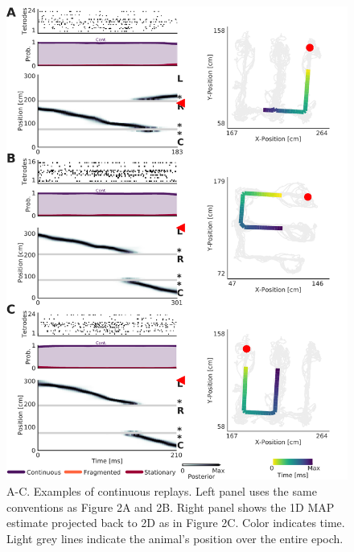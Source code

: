 \documentclass[times, twoside]{zHenriquesLab-StyleBioRxiv}
\begin{document}
\begin{figure}%
\centering
\includegraphics[width=0.80\linewidth]{figures/Figure2-supplemental2/Figure2_v3-supplemental2}
\caption{A-C. Examples of continuous replays. Left panel uses the same conventions as Figure 2A and 2B. Right panel shows the 1D MAP estimate projected back to 2D as in Figure 2C. Color indicates time. Light grey lines indicate the animal's position over the entire epoch.}
\label{fig:Figure2-Figure supplement 2}
\end{figure}
\end{document}
